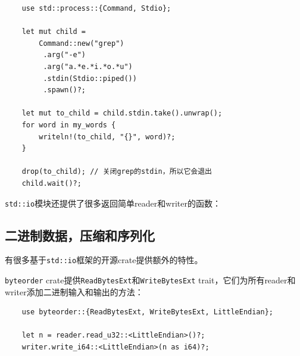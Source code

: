 
\begin{verbatim}
    use std::process::{Command, Stdio};

    let mut child =
        Command::new("grep")
         .arg("-e")
         .arg("a.*e.*i.*o.*u")
         .stdin(Stdio::piped())
         .spawn()?;
    
    let mut to_child = child.stdin.take().unwrap();
    for word in my_words {
        writeln!(to_child, "{}", word)?;
    }

    drop(to_child); // 关闭grep的stdin，所以它会退出
    child.wait()?;
\end{verbatim}

\texttt{std::io}模块还提供了很多返回简单reader和writer的函数：



\subsection{二进制数据，压缩和序列化}
有很多基于\texttt{std::io}框架的开源crate提供额外的特性。

\texttt{byteorder} crate提供\texttt{ReadBytesExt}和\texttt{WriteBytesExt} trait，它们为所有reader和writer添加二进制输入和输出的方法：
\begin{verbatim}
    use byteorder::{ReadBytesExt, WriteBytesExt, LittleEndian};

    let n = reader.read_u32::<LittleEndian>()?;
    writer.write_i64::<LittleEndian>(n as i64)?;
\end{verbatim}

